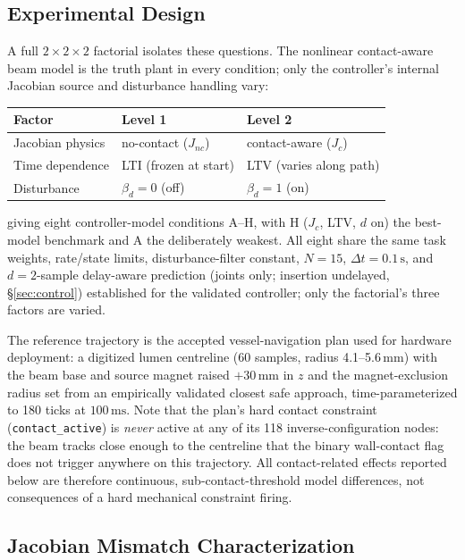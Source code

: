 \documentclass[journal]{IEEEtran}
\begin{document}
\subsection{Experimental Design}
\label{sec:mn-design}

A full $2\times2\times2$ factorial isolates these questions. The
nonlinear contact-aware beam model is the truth plant in every
condition; only the controller's internal Jacobian source and
disturbance handling vary:
\begin{center}
\begin{tabular}{@{}lll@{}}
\toprule
Factor & Level 1 & Level 2 \\
\midrule
Jacobian physics & no-contact ($J_{nc}$) & contact-aware ($J_c$) \\
Time dependence & LTI (frozen at start) & LTV (varies along path) \\
Disturbance & $\beta_d=0$ (off) & $\beta_d=1$ (on) \\
\bottomrule
\end{tabular}
\end{center}
giving eight controller-model conditions A--H, with H
($J_c$, LTV, $d$ on) the best-model benchmark and A the deliberately
weakest. All eight share the same task weights, rate/state limits,
disturbance-filter constant, $N=15$, $\Delta t=0.1\,\mathrm{s}$, and
$d=2$-sample delay-aware prediction (joints only; insertion
undelayed, \S\ref{sec:control}) established for the validated
controller; only the factorial's three factors are varied.

The reference trajectory is the accepted vessel-navigation plan used
for hardware deployment: a digitized lumen centreline (60 samples,
radius 4.1--5.6\,mm) with the beam base and source magnet raised
$+30\,\mathrm{mm}$ in $z$ and the magnet-exclusion radius set from an
empirically validated closest safe approach, time-parameterized to 180
ticks at $100\,\mathrm{ms}$. Note that the plan's hard contact
constraint (\texttt{contact\_active}) is \emph{never} active at any of
its 118 inverse-configuration nodes: the beam tracks close enough to
the centreline that the binary wall-contact flag does not trigger
anywhere on this trajectory. All contact-related effects reported
below are therefore continuous, sub-contact-threshold model
differences, not consequences of a hard mechanical constraint firing.

\subsection{Jacobian Mismatch Characterization}
\label{sec:mn-exp1}
\end{document}
